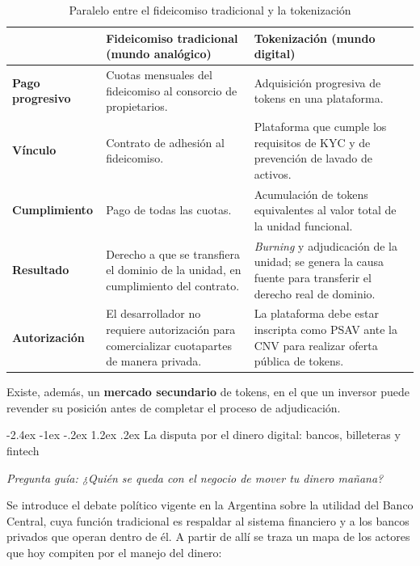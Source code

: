 \documentclass[12pt,oneside]{book}
\makeatletter
\renewcommand\section{\@startsection{section}{1}{\z@}%
  {-2.4ex \@plus -1ex \@minus -.2ex}%
  {1.2ex \@plus .2ex}%
  {\normalfont\Large\bfseries\color{blue!50!black}}}
\newcommand{\guia}[1]{\noindent\textit{Pregunta guía: #1}\par\smallskip}
\makeatother
\begin{document}
\begin{table}[H]
\centering
\caption{Paralelo entre el fideicomiso tradicional y la tokenización}
\renewcommand{\arraystretch}{1.25}
\small
\begin{tabularx}{\textwidth}{
    >{\raggedright\arraybackslash}p{}
    >{\raggedright\arraybackslash}X
    >{\raggedright\arraybackslash}X
}
\toprule
& \textbf{Fideicomiso tradicional (mundo analógico)} & \textbf{Tokenización (mundo digital)} \\
\midrule
\textbf{Pago progresivo} & Cuotas mensuales del fideicomiso al consorcio de propietarios. & Adquisición progresiva de tokens en una plataforma. \\
\midrule[0.3pt]
\textbf{Vínculo} & Contrato de adhesión al fideicomiso. & Plataforma que cumple los requisitos de KYC y de prevención de lavado de activos. \\
\midrule[0.3pt]
\textbf{Cumplimiento} & Pago de todas las cuotas. & Acumulación de tokens equivalentes al valor total de la unidad funcional. \\
\midrule[0.3pt]
\textbf{Resultado} & Derecho a que se transfiera el dominio de la unidad, en cumplimiento del contrato. & \textit{Burning} y adjudicación de la unidad; se genera la causa fuente para transferir el derecho real de dominio. \\
\midrule[0.3pt]
\textbf{Autorización} & El desarrollador no requiere autorización para comercializar cuotapartes de manera privada. & La plataforma debe estar inscripta como PSAV ante la CNV para realizar oferta pública de tokens. \\
\bottomrule
\end{tabularx}
\end{table}

Existe, además, un \textbf{mercado secundario} de tokens, en el que un inversor puede revender su posición antes de completar el proceso de adjudicación.

\section{La disputa por el dinero digital: bancos, billeteras y fintech}

\guia{¿Quién se queda con el negocio de mover tu dinero mañana?}

Se introduce el debate político vigente en la Argentina sobre la utilidad del Banco Central, cuya función tradicional es respaldar al sistema financiero y a los bancos privados que operan dentro de él. A partir de allí se traza un mapa de los actores que hoy compiten por el manejo del dinero:
\end{document}
